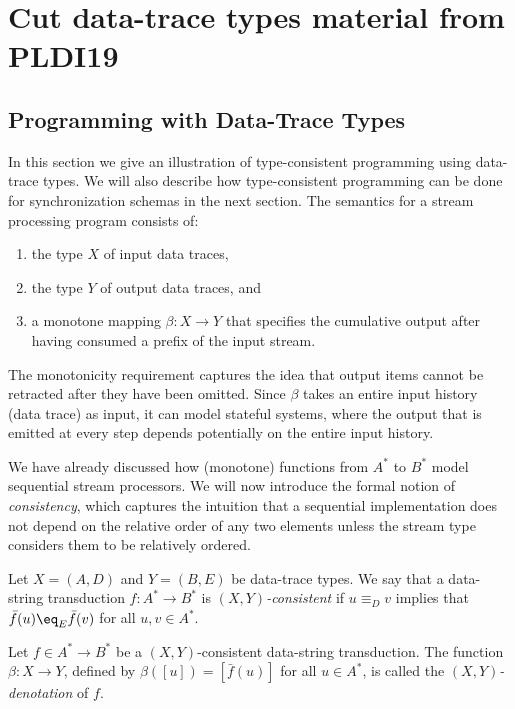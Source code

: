 \chapter{Cut data-trace types material from PLDI19}

\section{Programming with Data-Trace Types}
\label{subsec:dtt-2}

In this section we give an illustration of type-consistent programming
using data-trace types.
We will also describe how type-consistent programming can be done for
synchronization schemas in the next section.
The semantics for a stream processing program consists of:
\begin{enumerate}
\item
the type $X$ of input data traces,
\item
the type $Y$ of output data traces, and
\item
a monotone mapping $\beta: X \to Y$ that specifies the cumulative output after having consumed a prefix of the input stream.
\end{enumerate}
The monotonicity requirement captures the idea that output items cannot be retracted after they have been omitted. Since $\beta$ takes an entire input history (data trace) as input, it can model stateful systems, where the output that is emitted at every step depends potentially on the entire input history.

We have already discussed how (monotone) functions from $A^*$ to $B^*$ model sequential stream processors. We will now introduce the formal notion of \emph{consistency}, which captures the intuition that a sequential implementation does not depend on the relative order of any two elements unless the stream type considers them to be relatively ordered.

\begin{definition}[Consistency]
Let $X = (A,D)$ and $Y = (B,E)$ be data-trace types. We say that a data-string transduction $f: A^* \to B^*$
is \emph{$(X,Y)$-consistent} if $u \equiv_D v$ implies that $\bar{f}(u) \eq_{E} \bar{f}(v)$ for all $u, v \in A^*$.

Let $f \in A^* \to B^*$ be a $(X,Y)$-consistent data-string transduction. The function $\beta: X \to Y$, defined by
$\beta([u]) = [\bar f(u)]$ for all $u \in A^*$, is called the \emph{$(X,Y)$-denotation} of $f$.
\end{definition}

